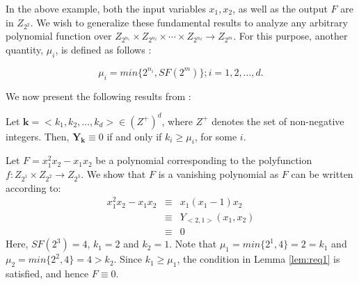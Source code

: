 In the above example, both the input variables $x_1, x_2$, as well as
the output $F$ are in $Z_{2^2}$. We wish to generalize these
fundamental results to analyze any arbitrary polynomial function over
$Z_{2^{n_1}} \times Z_{2^{n_2}} \times \cdots \times Z_{2^{n_d}}
\rightarrow Z_{2^{m}}$. For this purpose, another quantity, $\mu_i$,
is defined as follows \cite{chen_96}: 

\begin{equation} \label{eqn:mu}
\mu_i = min\{2^{n_i}, SF(2^m)\};  i = 1, 2, \ldots, d.
\end{equation}

We now present the following results from \cite{chen_96}:

\begin{Lemma}\label{lem:req1}
Let $\textbf{k} = <k_1, k_2, \ldots, k_d> \in (Z^+)^d$, where $Z^+$
denotes the set of non-negative integers. Then, $\textbf{Y}_\textbf{k} 
\equiv 0$ if and only if $k_i \geq \mu_i$, for some $i$.
\end{Lemma}

\begin{Example}\label{ex:mu}
Let $F = x_1^2 x_2 - x_1 x_2$ be a polynomial corresponding to the
polyfunction  $f:Z_{2^1} \times Z_{2^2} \rightarrow Z_{2^3}$. 
We show that $F$ is a vanishing polynomial as $F$ can be written
according to:
\begin{eqnarray}
x_1^2 x_2 - x_1 x_2 &\equiv& x_1(x_1-1)x_2 \nonumber\\
          &\equiv& Y_{<2,1>}(x_1, x_2) \nonumber\\
          &\equiv& 0 \nonumber
\end{eqnarray}
Here, $SF(2^3) = 4$, $k_1 = 2$ and $k_2 = 1$. Note that $\mu_1 = 
min\{2^{1}, 4\} = 2 = k_1$  and $\mu_2 = min\{2^{2}, 4\} = 4 >
k_2$. Since $k_1 \geq \mu_1$, the condition in Lemma \ref{lem:req1} is
satisfied, and hence $F \equiv 0$. 
\end{Example}


